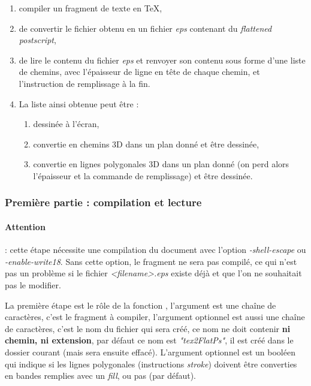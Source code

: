 \begin{enumerate}
    \item compiler un fragment de texte en \TeX,
    \item de convertir le fichier obtenu en un fichier \emph{eps} contenant du \emph{flattened postscript},
    \item de lire le contenu du fichier \emph{eps} et renvoyer son contenu sous forme d'une liste de chemins, avec l'épaisseur de ligne en tête de chaque chemin, et l'instruction de remplissage à la fin.
    \item La liste ainsi obtenue peut être :
        \begin{enumerate}
            \item dessinée à l'écran,
            \item convertie en chemins 3D dans un plan donné et être dessinée,
            \item convertie en lignes polygonales 3D dans un plan donné (on perd alors l'épaisseur et la commande de remplissage) et être dessinée.
        \end{enumerate}
\end{enumerate}

\subsubsection{Première partie : compilation et lecture}

\paragraph{Attention} : cette étape nécessite une compilation du document avec l'option \emph{-shell-escape} ou \emph{-enable-write18}.
Sans cette option, le fragment ne sera pas compilé, ce qui n'est pas un problème si le fichier \emph{<filename>.eps} existe déjà et que l'on ne souhaitait pas le modifier.


La première étape est le rôle de la fonction , l'argument  est une chaîne de caractères, c'est le fragment à compiler, l'argument optionnel  est aussi une chaîne de caractères, c'est le nom du fichier qui sera créé, ce nom ne doit contenir \textbf{ni chemin, ni extension}, par défaut ce nom est \emph{"tex2FlatPs"}, il est créé dans le dossier courant (mais sera ensuite effacé). L'argument optionnel  est un booléen qui indique si les lignes polygonales (instructions \emph{stroke}) doivent être converties en bandes remplies avec un \emph{fill}, ou pas (\false par défaut).

